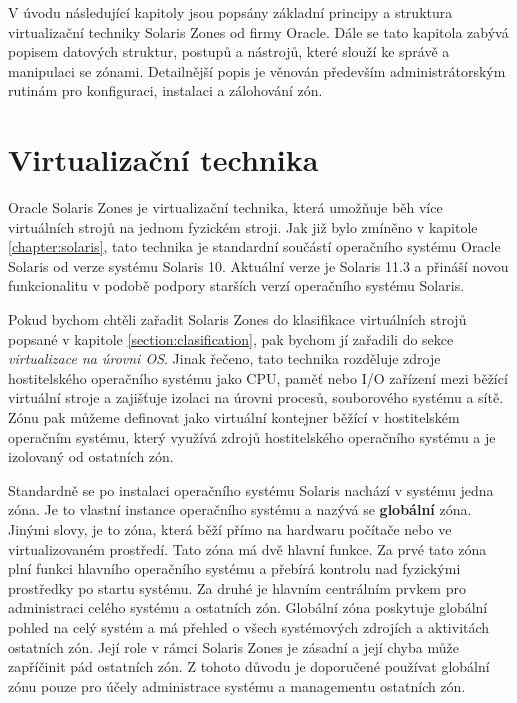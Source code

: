 V úvodu následující kapitoly jsou popsány základní principy a struktura virtualizační techniky Solaris Zones od
firmy Oracle. Dále se tato kapitola zabývá popisem datových struktur, postupů a nástrojů, které slouží ke správě a manipulaci
se zónami. Detailnější popis je věnován především administrátorským rutinám pro konfiguraci, instalaci a zálohování zón.


\section{Virtualizační technika}
Oracle Solaris Zones je virtualizační technika, která umožňuje běh více virtuálních strojů na jednom fyzickém stroji. Jak již
bylo zmíněno v kapitole \ref{chapter:solaris}, tato technika je standardní součástí operačního systému Oracle Solaris od 
verze systému Solaris 10. Aktuální verze je Solaris 11.3 a přináší novou funkcionalitu v podobě podpory starších verzí 
operačního systému Solaris.

Pokud bychom chtěli zařadit Solaris Zones do klasifikace virtuálních strojů popsané v kapitole \ref{section:clasification}, 
pak bychom jí zařadili do sekce \textit{virtualizace na úrovni OS}. Jinak řečeno, tato technika rozděluje zdroje hostitelského
operačního systému jako CPU, paměť nebo I/O zařízení mezi běžící virtuální stroje a zajišťuje izolaci na úrovni procesů,
souborového systému a sítě. Zónu pak můžeme definovat jako virtuální kontejner běžící v hostitelském operačním systému, který
využívá zdrojů hostitelského operačního systému a je izolovaný od ostatních zón.

Standardně se po instalaci operačního systému Solaris nachází v systému jedna zóna. Je to vlastní instance operačního systému
a nazývá se \textbf{globální} zóna. Jinými slovy, je to zóna, která běží přímo na hardwaru počítače nebo ve virtualizovaném
prostředí. Tato zóna má dvě hlavní funkce. Za prvé tato zóna plní funkci hlavního operačního systému a přebírá kontrolu
nad fyzickými prostředky po startu systému. Za druhé je hlavním centrálním prvkem pro administraci celého systému a ostatních
zón. Globální zóna poskytuje globální pohled na celý systém a má přehled o všech systémových zdrojích a aktivitách ostatních
zón. Její role v rámci Solaris Zones je zásadní a její chyba může zapříčinit pád ostatních zón. Z tohoto důvodu je doporučené
používat globální zónu pouze pro účely administrace systému a managementu ostatních zón.

